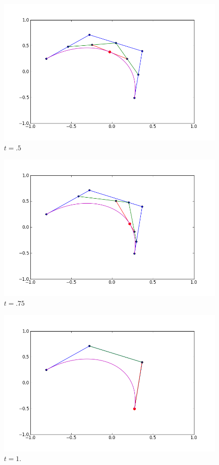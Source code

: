 \begin{figure}
\includegraphics[width=\textwidth]{decasteljau_3}
\caption{$t=.5$}
\label{bezier:decasteljau_3}
\end{figure}

\begin{figure}
\includegraphics[width=\textwidth]{decasteljau_4}
\caption{$t=.75$}
\label{bezier:decasteljau_4}
\end{figure}

\begin{figure}
\includegraphics[width=\textwidth]{decasteljau_5} 
\caption{$t=1$.}
\label{bezier:decasteljau_5}
\end{figure}

